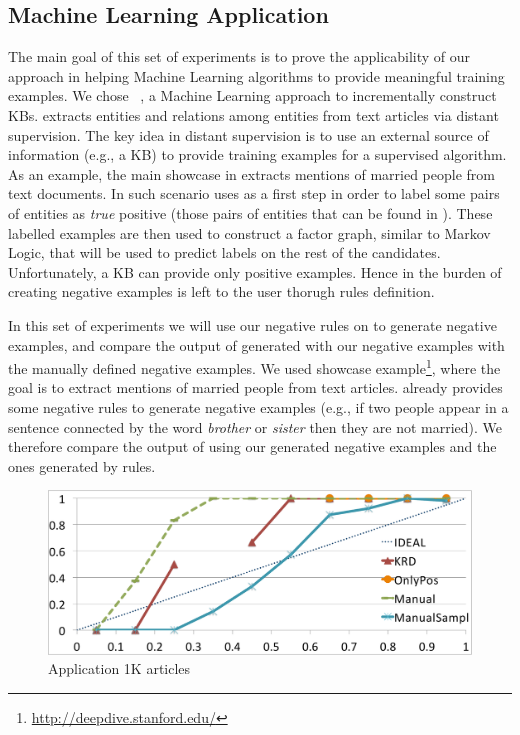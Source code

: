 \subsection{Machine Learning Application}
The main goal of this set of experiments is to prove the applicability of our approach in helping Machine Learning algorithms to provide meaningful training examples.
We chose \deepdive~\cite{shin2015incremental}, a Machine Learning approach to incrementally construct KBs. \deepdive extracts entities and relations among entities from text articles via distant supervision. The key idea in distant supervision is to use an external source of information (e.g., a KB) to provide training examples for a supervised algorithm. As an example, the main showcase in \deepdive extracts mentions of married people from text documents. In such scenario \deepdive uses as a first step \dbpedia in order to label some pairs of entities as \emph{true} positive (those pairs of entities that can be found in \dbpedia). These labelled examples are then used to construct a factor graph, similar to Markov Logic, that will be used to predict labels on the rest of the candidates. Unfortunately, a KB can provide only positive examples. Hence in \deepdive the burden of creating negative examples is left to the user thorugh rules definition. 

In this set of experiments we will use our negative rules on \dbpedia to generate negative examples, and compare the output of \deepdive generated with our negative examples with the manually defined negative examples. We used \deepdive showcase example\footnote{\url{http://deepdive.stanford.edu/}}, where the goal is to extract mentions of married people from text articles. \deepdive already provides some negative rules to generate negative examples (e.g., if two people appear in a sentence connected by the word \textit{brother} or \textit{sister} then they are not married). We therefore compare the output of \deepdive using our generated negative examples and the ones generated by \deepdive rules.

\begin{figure}[t]
	\centering
	\includegraphics[width=\columnwidth]{include/figure/deepDive1K.pdf}
	\caption{\deepdive Application 1K articles}
	\label{fig:deep_dive_1k}
\end{figure}

